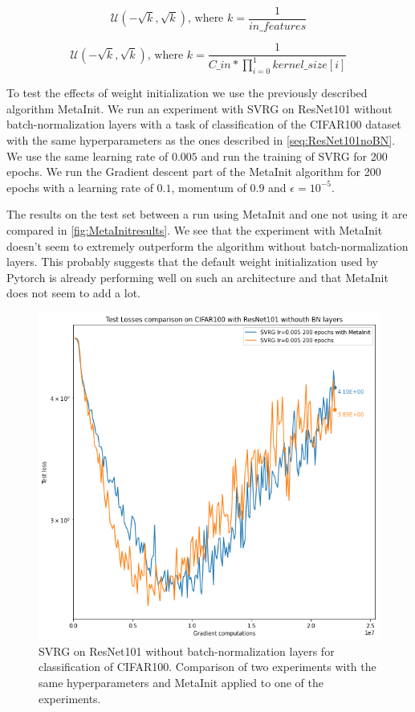 \documentclass[a4paper,11pt,oneside]{report}
\begin{document}
\begin{equation}\label{eq:initLinearLayers}
    \mathcal{U}(-\sqrt{k}, \sqrt{k}) \text{, where } k = \frac{1}{in\_features}
\end{equation}

\begin{equation}\label{eq:initConv2dLayers}
    \mathcal{U}(-\sqrt{k}, \sqrt{k}) \text{, where }
    k = \frac{1}{C\_in * \prod_{i=0}^{1}kernel\_size[i]} 
\end{equation}

To test the effects of weight initialization we use the previously described algorithm MetaInit. We run an experiment with SVRG on ResNet101 without batch-normalization layers with a task of classification of the CIFAR100 dataset with the same hyperparameters as the ones described in \autoref{seq:ResNet101noBN}. We use the same learning rate of $0.005$ and run the training of SVRG for 200 epochs. We run the Gradient descent part of the MetaInit algorithm for 200 epochs with a learning rate of $0.1$, momentum of $0.9$ and $\epsilon = 10^{-5}$.  

The results on the test set between a run using MetaInit and one not using it are compared in \autoref{fig:MetaInitresults}. We see that the experiment with MetaInit doesn't seem to extremely outperform  the algorithm without batch-normalization layers. This probably suggests that the default weight initialization used by Pytorch is already performing well on such an architecture and that MetaInit does not seem to add a lot. 

\begin{figure}
    \centering
    \includegraphics[width=\columnwidth]{figures/MetaInitresults.png}
    \caption{SVRG on ResNet101 without batch-normalization layers for classification of CIFAR100. Comparison of two experiments with the same hyperparameters and MetaInit applied to one of the experiments.}
    \label{fig:MetaInitresults}
\end{figure}
\end{document}

